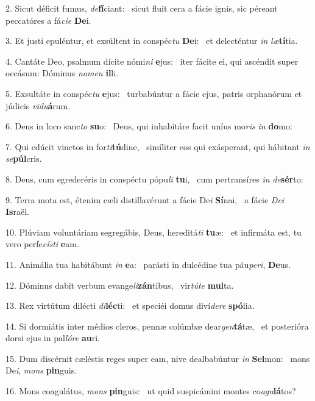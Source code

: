 2. Sicut déficit fumus, \textit{de}\textbf{fí}ciant: \ast\  sicut fluit cera a fácie ignis, sic péreant peccatóres a fá\textit{ci}\textit{e} \textbf{De}i.\

3. Et justi epuléntur, et exsúltent in conspéc\textit{tu} \textbf{De}i: \ast\  et delecténtur \textit{in} \textit{læ}\textbf{tí}tia.\

4. Cantáte Deo, psalmum dícite nómi\textit{ni} \textbf{e}jus: \ast\  iter fácite ei, qui ascéndit super occásum: Dóminus \textit{no}\textit{men} \textbf{il}li.\

5. Exsultáte in conspéc\textit{tu} \textbf{e}jus: \ast\  turbabúntur a fácie ejus, patris orphanórum et júdicis \textit{vi}\textit{du}\textbf{á}rum.\

6. Deus in loco sanc\textit{to} \textbf{su}o: \ast\  Deus, qui inhabitáre facit uníus mo\textit{ris} \textit{in} \textbf{do}mo:\

7. Qui edúcit vinctos in for\textit{ti}\textbf{tú}dine, \ast\  simíliter eos qui exásperant, qui hábitant \textit{in} \textit{se}\textbf{púl}cris.\

8. Deus, cum egrederéris in conspéctu pópu\textit{li} \textbf{tu}i, \ast\  cum pertransíres \textit{in} \textit{de}\textbf{sér}to:\

9. Terra mota est, étenim cæli distillavérunt a fácie De\textit{i} \textbf{Sí}nai, \ast\  a fácie \textit{De}\textit{i} \textbf{Is}raël.\

10. Plúviam voluntáriam segregábis, Deus, hereditá\textit{ti} \textbf{tu}æ: \ast\  et infirmáta est, tu vero perfe\textit{cís}\textit{ti} \textbf{e}am.\

11. Animália tua habitábunt \textit{in} \textbf{e}a: \ast\  parásti in dulcédine tua páu\textit{pe}\textit{ri}, \textbf{De}us.\

12. Dóminus dabit verbum evange\textit{li}\textbf{zán}tibus, \ast\  vir\textit{tú}\textit{te} \textbf{mul}ta.\

13. Rex virtútum dilécti \textit{di}\textbf{léc}ti: \ast\  et speciéi domus diví\textit{de}\textit{re} \textbf{spó}lia.\

14. Si dormiátis inter médios cleros, pennæ colúmbæ dear\textit{gen}\textbf{tá}tæ, \ast\  et posterióra dorsi ejus in pal\textit{ló}\textit{re} \textbf{au}ri.\

15. Dum discérnit cæléstis reges super eam, nive dealbabúntur \textit{in} \textbf{Sel}mon: \ast\  mons De\textit{i}, \textit{mons} \textbf{pin}guis.\

16. Mons coagulátus, \textit{mons} \textbf{pin}guis: \ast\  ut quid suspicámini montes co\textit{a}\textit{gu}\textbf{lá}tos?\


